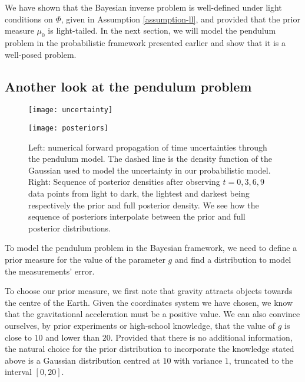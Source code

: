 We have shown that the Bayesian inverse problem is well-defined under light conditions on $\Phi$, given in Assumption \ref{assumption-ll}, and provided that the prior measure $\mu_0$ is light-tailed. In the next section, we will model the pendulum problem in the probabilistic framework presented earlier and show that it is a well-posed problem.

\subsection{Another look at the pendulum problem}

\begin{figure}[t!]
  \begin{minipage}{.5\textwidth}
    \texttt{[image: uncertainty]}
  \end{minipage}
  \begin{minipage}{.5\textwidth}
    \texttt{[image: posteriors]}
  \end{minipage}
  \caption{Left: numerical forward propagation of time uncertainties through the pendulum model. The dashed line is the density function of the Gaussian used to model the uncertainty in our probabilistic model. Right: Sequence of posterior densities after observing $t=0, 3, 6, 9$ data points from light to dark, the lightest and darkest being respectively the prior and full posterior density. We see how the sequence of posteriors interpolate between the prior and full posterior distributions. }
  \label{uncertainty-posteriors}
\end{figure}



To model the pendulum problem in the Bayesian framework, we need to define a prior measure for the value of the parameter $g$ and find a distribution to model the measurements' error.

To choose our prior measure, we first note that gravity attracts objects towards the centre of the Earth. Given the coordinates system we have chosen, we know that the gravitational acceleration must be a positive value. We can also convince ourselves, by prior experiments or high-school knowledge, that the value of $g$ is close to $10$ and lower than $20$. Provided that there is no additional information, the natural choice for the prior distribution to incorporate the knowledge stated above is a Gaussian distribution centred at $10$ with variance $1$, truncated to the interval $[0, 20]$.

